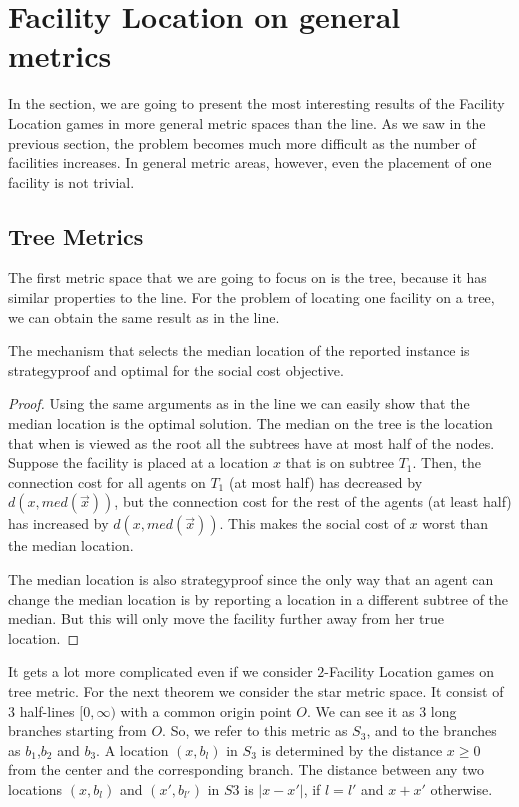 \section{Facility Location on general metrics}

In the section, we are going to present the most interesting results of the Facility Location games in more general metric spaces than the line. As we saw in the previous section, the problem becomes much more difficult as the number of facilities increases. In general metric areas, however, even the placement of one facility is not trivial.

\subsection{Tree Metrics}
The first metric space that we are going to focus on is the tree, because it has similar properties to the line. For the problem of locating one facility on a tree, we can obtain the same result as in the line. 

\begin{theorem}
The mechanism that selects the median location of the reported instance is strategyproof and optimal for the social cost objective.
\end{theorem}
\begin{proof}
Using the same arguments as in the line we can easily show that the median location is the optimal solution. The median on the tree is the location that when is viewed as the root all the subtrees have at most half of the nodes. Suppose the facility is placed at a location $x$ that is on subtree $T_1$. Then, the connection cost for all agents on $T_1$ (at most half) has decreased by $d(x,med(\vec{x}))$, but the connection cost for the rest of the agents (at least half) has increased by $d(x,med(\vec{x}))$. This makes the social cost of $x$ worst than the median location.

The median location is also strategyproof since the only way that an agent can change the median location is by reporting a location in a different subtree of the median. But this will only move the facility further away from her true location. 
\end{proof}

It gets a lot more complicated even if we consider $2$-Facility Location games on tree metric. For the next theorem we consider the star metric space. It consist of 3 half-lines $[0,\infty)$ with a common origin point $O$. We can see it as 3 long branches starting from $O$. So, we refer to this metric as $S_3$, and  to the branches as $b_1$,$b_2$ and $b_3$. A location $(x,b_l)$ in $S_3$ is determined by the distance $x\ge 0$ from the center and the corresponding branch. The distance between any two locations  $(x,b_l)$ and $(x',b_{l'})$ in $S3$ is $|x-x'|$, if $l=l'$ and $x+x'$ otherwise.

